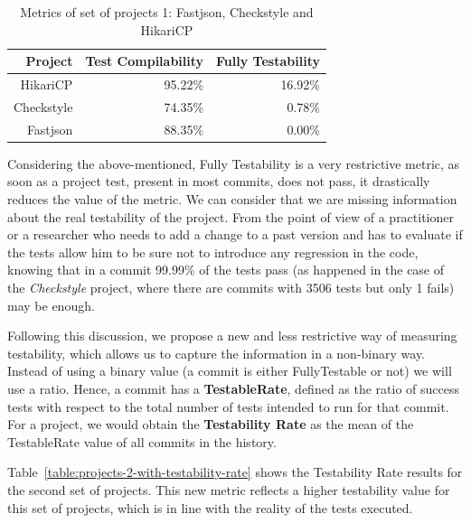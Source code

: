 \begin{figure}[!htb]
\begin{minipage}{.5\linewidth}
        \label{fig:hikari}
    \end{minipage}%
\end{figure}

\begin{table}[h!]
    \centering
    \begin{tabular}{|r|r|r|}
    \hline
    \textbf{Project} & \textbf{Test Compilability} & \textbf{Fully Testability} \\ \hline
    HikariCP         & 95.22\%                      & 16.92\%                      \\ \hline
    Checkstyle       & 74.35\%                      & 0.78\%                      \\ \hline
    Fastjson         & 88.35\%                      & 0.00\%                      \\ \hline
    \end{tabular}
    \caption{Metrics of set of projects 1: Fastjson, Checkstyle and HikariCP}
    \label{table:projects-2}
\end{table}

Considering the above-mentioned, Fully Testability is a very restrictive metric, as soon as a project test, present in most commits, does not pass, it drastically reduces the value of the metric. 
We can consider that we are missing information about the real testability of the project.
From the point of view of a practitioner or a researcher who needs to add a change to a past version and has to evaluate if the tests allow him to be sure not to introduce any regression in the code, knowing that in a commit 99.99\% of the tests pass (as happened in the case of the \textit{Checkstyle} project, where there are commits with 3506 tests but only 1 fails) may be enough.

Following this discussion, we propose a new and less restrictive way of measuring testability, which allows us to capture the information in a non-binary way. 
Instead of using a binary value (a commit is either FullyTestable or not) we will use a ratio. 
Hence, a commit has a \textbf{TestableRate}, defined as the ratio of success tests with respect to the total number of tests intended to run for that commit.
For a project, we would obtain the \textbf{Testability Rate} as the mean of the TestableRate value of all commits in the history.

Table~\ref{table:projects-2-with-testability-rate} shows the Testability Rate results for the second set of projects.
This new metric reflects a higher testability value for this set of projects, which is in line with the reality of the tests executed.


